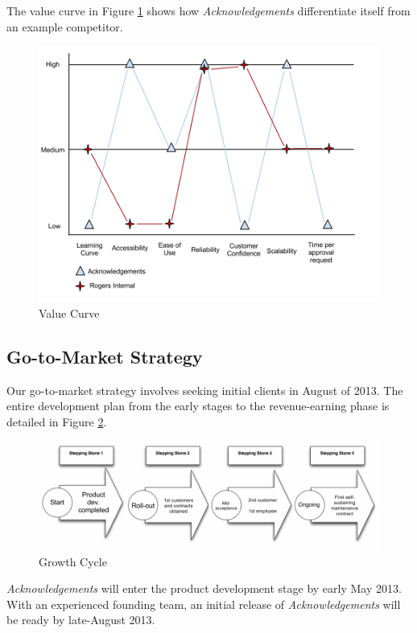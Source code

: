 The value curve in Figure \ref{valuecurve} shows how {\it Acknowledgements} differentiate itself from an example competitor.

\begin{figure}[ht!]
\centering
\includegraphics[width=125mm]{images/MSCI454-ValueCurve.png}
\caption{Value Curve}
\label{valuecurve}
\end{figure}

\subsection{Go-to-Market Strategy}

Our go-to-market strategy involves seeking initial clients in August of 2013. The entire development plan from the early stages to the revenue-earning phase is detailed in Figure \ref{growthCycle}.

\begin{figure}[ht!]
\centering
\includegraphics[width=150mm]{images/MSCI454-SteppingStones.png}
\caption{Growth Cycle}
\label{growthCycle}
\end{figure}

{\it Acknowledgements} will enter the product development stage by early May 2013. With an experienced founding team, an initial release of {\it Acknowledgements} will be ready by late-August 2013.

